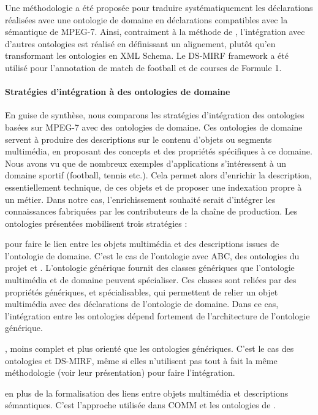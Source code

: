 Une méthodologie a été proposée pour traduire systématiquement les déclarations réalisées avec une ontologie de domaine en déclarations compatibles avec la sémantique de MPEG-7.
Ainsi, contraiment à la méthode de , l'intégration avec d'autres ontologies est réalisé en définissant un alignement, plutôt qu'en transformant les ontologies en XML Schema.
Le DS-MIRF framework a été utilisé pour l'annotation de match de football et de courses de Formule 1.


\paragraph{Stratégies d'intégration à des ontologies de domaine}\label{sec:strats-domaine}
En guise de synthèse, nous comparons les stratégies d'intégration des ontologies basées sur MPEG-7 avec des ontologies de domaine.
Ces ontologies de domaine servent à produire des descriptions sur le contenu d'objets ou segments multimédia, en proposant des concepts et des propriétés spécifiques à ce domaine. 
Nous avons vu que de nombreux exemples d'applications s'intéressent à un domaine sportif (football, tennis etc.).
Cela permet alors d'enrichir la description, essentiellement technique, de ces objets et de proposer une indexation propre à un métier.
Dans notre cas, l'enrichissement souhaité serait d'intégrer les connaissances fabriquées par les contributeurs de la chaîne de production.
Les ontologies présentées mobilisent trois stratégies : 
\begin{liste}
	\item {} pour faire le lien entre les objets multimédia et des descriptions issues de l'ontologie de domaine. 
	C'est le cas de l'ontologie  avec ABC, des ontologies du projet  et .
	L'ontologie générique fournit des classes génériques que l'ontologie multimédia et de domaine peuvent spécialiser. 
	Ces classes sont reliées par des propriétés génériques, et spécialisables, qui permettent de relier un objet multimédia avec des déclarations de l'ontologie de domaine.
	Dans ce cas, l'intégration entre les ontologies dépend fortement de l'architecture de l'ontologie générique.

	\item {}, moins complet et plus orienté que les ontologies génériques.
	C'est le cas des ontologies  et DS-MIRF, même si elles n'utilisent pas tout à fait la même méthodologie (voir leur présentation) pour faire l'intégration.

	\item {} en plus de la formalisation des liens entre objets multimédia et descriptions sémantiques. 
	C'est l'approche utilisée dans COMM et les ontologies de .
\end{liste}


